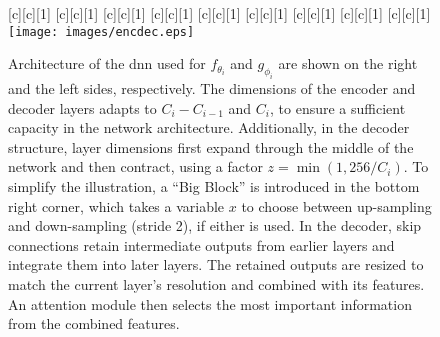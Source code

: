 \begin{figure}[t]
\begin{center}
[c][c][1]{\scalebox{\textsizescale}{$x = $ up, $y=  C_i \times z$}}
[c][c][1]{\scalebox{\textsizescale}{attention module}}
[c][c][1]{\scalebox{\textsizescale}{Big Block}}
[c][c][1]{}
[c][c][1]{\scalebox{\textsizescale}{residual block}}
[c][c][1]{\scalebox{\textsizescale}{$3$ output channels}}
[c][c][1]{\scalebox{\textsizescale}{Sigmoid}}
[c][c][1]{\scalebox{.7}{reconstructed image}}
[c][c][1]{\scalebox{.7}{$3 \times 32 \times 32$ pixels}}
\texttt{[image: images/encdec.eps]} 
\caption{Architecture of the \gls{dnn} used for $f_{\theta_i}$  and  $g_{\phi_i}$ are shown on the right and the left sides, respectively. The dimensions of the encoder and decoder layers adapts to $C_i - C_{i-1}$ and $C_i$, to ensure a sufficient capacity in the network architecture. Additionally, in the decoder structure,  layer dimensions first expand through the middle of the network and then contract, using a factor $z = \min (1, 256/C_i)$. To simplify the illustration, a ``Big Block'' is introduced in the bottom right corner, which takes a variable $x$ to choose between up-sampling and down-sampling (stride 2), if either is used. In the decoder, skip connections retain intermediate outputs from earlier layers and integrate them into later layers. The retained outputs are resized to match the current layer's resolution and combined with its features. An attention module then selects the most important information from the combined features.
}
\label{fig:encdec}
\end{center}
\end{figure}


